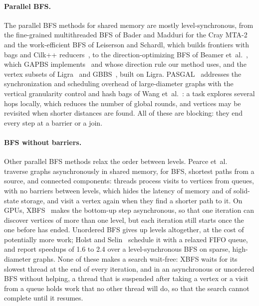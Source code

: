 \paragraph{Parallel BFS\@.} The parallel BFS methods for shared memory are mostly level-synchronous, from the fine-grained multithreaded BFS of Bader and Madduri for the Cray MTA-2~\cite{bader_bfs} and the work-efficient BFS of Leiserson and Schardl, which builds frontiers with bags and Cilk++ reducers~\cite{charles_bfs}, to the direction-optimizing BFS of Beamer et~al.~\cite{beamer_dobfs}, which GAPBS implements~\cite{gapbs} and whose direction rule our method uses, and the vertex subsets of Ligra~\cite{ligra} and GBBS~\cite{gbbs}, built on Ligra. PASGAL~\cite{pasgal} addresses the synchronization and scheduling overhead of large-diameter graphs with the vertical granularity control and hash bags of Wang et~al.~\cite{vgc_hashbag}: a task explores several hops locally, which reduces the number of global rounds, and vertices may be revisited when shorter distances are found. All of these are blocking: they end every step at a barrier or a join.

\paragraph{BFS without barriers.} Other parallel BFS methods relax the order between levels. Pearce et~al.~\cite{pearce_async} traverse graphs asynchronously in shared memory, for BFS, shortest paths from a source, and connected components: threads process visits to vertices from queues, with no barriers between levels, which hides the latency of memory and of solid-state storage, and visit a vertex again when they find a shorter path to it. On GPUs, XBFS~\cite{xbfs} makes the bottom-up step asynchronous, so that one iteration can discover vertices of more than one level, but each iteration still starts once the one before has ended. Unordered BFS gives up levels altogether, at the cost of potentially more work; Holst and Selin~\cite{holst_unordered} schedule it with a relaxed FIFO queue, and report speedups of 1.6 to 2.4 over a level-synchronous BFS on sparse, high-diameter graphs. None of these makes a search wait-free: XBFS waits for its slowest thread at the end of every iteration, and in an asynchronous or unordered BFS without helping, a thread that is suspended after taking a vertex or a visit from a queue holds work that no other thread will do, so that the search cannot complete until it resumes.

